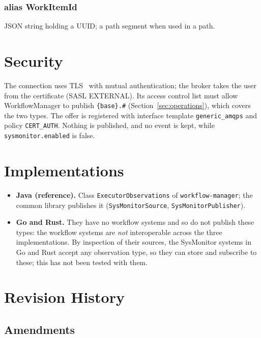 \documentclass[a4paper]{arrowhead}
\newcommand{\pdef}[1]{{\textcolor{ArrowheadGrey}{#1\label{sec:model:primitives:#1}\label{sec:model:primitives:#1s}}}}
\begin{document}
\subsubsection*{alias \pdef{WorkItemId}}
JSON string holding a UUID; a path segment when used in a path.


\section{Security}
\label{sec:security}
The connection uses TLS~\cite{rfc8446} with mutual authentication; the broker takes the user from the certificate (SASL
EXTERNAL). Its access control list must allow WorkflowManager to publish
\texttt{\{base\}.\#} (Section~\ref{sec:operations}), which covers the two types. The offer is registered with
interface template \texttt{generic\_\allowbreak{}amqps} and policy \texttt{CERT\_AUTH}. Nothing is published, and no event is kept,
while \texttt{sysmonitor.\allowbreak{}enabled} is false.

\section{Implementations}
\label{sec:implementations}
\begin{itemize}
\item \textbf{Java (reference).} Class \texttt{Executor\allowbreak{}Observations} of \texttt{workflow-\allowbreak{}manager}; the common library publishes
it (\texttt{Sys\allowbreak{}Monitor\allowbreak{}Source}, \texttt{Sys\allowbreak{}Monitor\allowbreak{}Publisher}).
\item \textbf{Go and Rust.} They have no workflow systems and so do not publish these types: the workflow systems are
\emph{not} interoperable across the three implementations. By inspection of their sources, the SysMonitor systems in Go and
Rust accept any observation type, so they can store and subscribe to these; this has not been tested with them.
\end{itemize}

\newpage



\newpage

\section{Revision History}
\subsection{Amendments}
\end{document}
